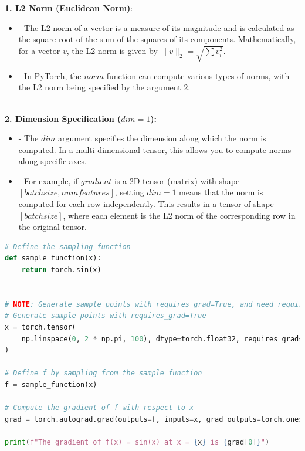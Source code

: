 \documentclass{article}
\begin{document}
\textbf{1. L2 Norm (Euclidean Norm)}: \\
\begin{itemize}
  \item    - The L2 norm of a vector is a measure of its magnitude and is calculated as the square root of the sum of the squares of its components. Mathematically, for a vector \( v \), the L2 norm is given by \( \|v\|_2 = \sqrt{\sum v_i^2} \).\\
  \item    - In PyTorch, the $norm$ function can compute various types of norms, with the L2 norm being specified by the argument $2$. \\
\end{itemize} \\
\textbf{2. Dimension Specification ($dim=1$):} \\
   \begin{itemize}
     \item    - The $dim$ argument specifies the dimension along which the norm is computed. In a multi-dimensional tensor, this allows you to compute norms along specific axes. \\
     \item    - For example, if $gradient$ is a 2D tensor (matrix) with shape $[batch size, num features]$, setting $dim=1$ means that the norm is computed for each row independently.
   This results in a tensor of shape $[batch size]$, where each element is the L2 norm of the corresponding row in the original tensor. \\

   \end{itemize}

\begin{lstlisting}[language=Python, caption=PyTorch gradient sampling example]
# Define the sampling function
def sample_function(x):
    return torch.sin(x)


# NOTE: Generate sample points with requires_grad=True, and need requires_grad=True
# Generate sample points with requires_grad=True
x = torch.tensor(
    np.linspace(0, 2 * np.pi, 100), dtype=torch.float32, requires_grad=True
)

# Define f by sampling from the sample_function
f = sample_function(x)

# Compute the gradient of f with respect to x
grad = torch.autograd.grad(outputs=f, inputs=x, grad_outputs=torch.ones_like(f))

print(f"The gradient of f(x) = sin(x) at x = {x} is {grad[0]}")

\end{lstlisting}
\end{document}
